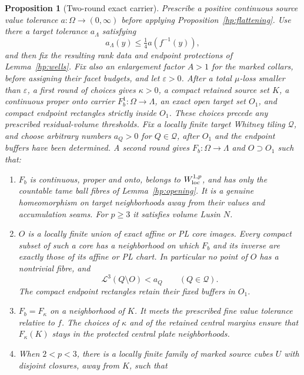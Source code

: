 \documentclass[11pt]{article}
\numberwithin{equation}{section}
\newtheorem{proposition}[theorem]{Proposition}
\theoremstyle{definition}
\theoremstyle{remark}
\begin{document}
\begin{proposition}[Two-round exact carrier]\label{hp:carrier}
Prescribe a positive continuous source value tolerance
$a:\Omega\to(0,\infty)$ before applying Proposition~\ref{hp:flattening}.
Use there a target tolerance $a_\Lambda$ satisfying
\[
 a_\Lambda(y)\leq\tfrac14 a(f^{-1}(y)),
\]
and then fix the resulting rank data and endpoint protections of
Lemma~\ref{hp:wells}.  Fix also an enlargement factor $A>1$ for the
marked collars, before assigning their facet budgets, and let $\varepsilon>0$.
After a total $\mu$-loss smaller than $\varepsilon$, a first round of choices
gives $\kappa>0$, a compact retained source set $K$, a continuous
proper onto carrier $F_b^1:\Omega\to\Lambda$, an exact open target
set $O_1$, and compact endpoint rectangles strictly inside $O_1$.
These choices precede any prescribed residual-volume thresholds.
Fix a locally finite target Whitney tiling $\mathcal Q$, and choose
arbitrary numbers $a_Q>0$ for $Q\in\mathcal Q$, after $O_1$ and the
endpoint buffers have been determined.  A second round gives
$F_b:\Omega\to\Lambda$ and $O\supset O_1$ such that:
\begin{enumerate}[label=\textup{(\roman*)}]
\item $F_b$ is continuous, proper and onto, belongs to
$W^{1,p}_{\rm loc}$, and has only the countable tame ball fibres of
Lemma~\ref{hp:opening}.  It is a genuine homeomorphism on target
neighborhoods away from their values and accumulation seams.
For $p\geq3$ it satisfies volume Lusin $N$.
\item $O$ is a locally finite union of exact affine or PL core
images.  Every compact subset of such a core has a neighborhood on
which $F_b$ and its inverse are exactly those of its affine or PL
chart.  In particular no point of $O$ has a nontrivial fibre, and
\begin{equation}\label{hp:residual-volume}
 \mathcal L^3(Q\setminus O)<a_Q\qquad(Q\in\mathcal Q).
\end{equation}
The compact endpoint rectangles retain their fixed buffers in $O_1$.
\item $F_b=F_\kappa$ on a neighborhood of $K$.  It meets the
prescribed fine value tolerance relative to $f$.  The choices of
$\kappa$ and of the retained central margins ensure that
$F_\kappa(K)$ stays in the protected central plate neighborhoods.
\item When $2<p<3$, there is a locally finite family of marked
source cubes $U$ with disjoint closures, away from $K$, such that
\begin{equation}\label{hp:small-marked-mass}

\end{equation}
\end{enumerate}
\end{proposition}
\end{document}
